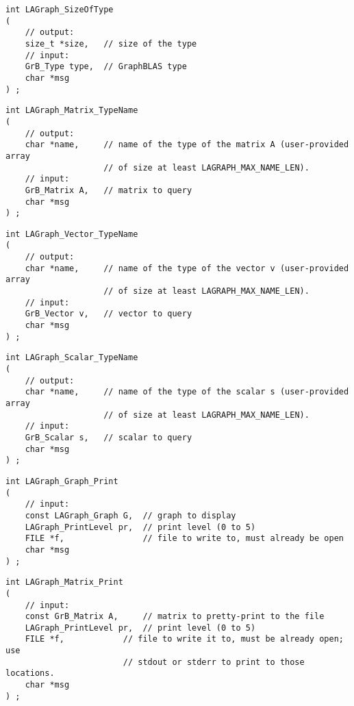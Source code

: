 \begin{verbatim}
int LAGraph_SizeOfType
(
    // output:
    size_t *size,   // size of the type
    // input:
    GrB_Type type,  // GraphBLAS type
    char *msg
) ;
\end{verbatim}




\begin{verbatim}
int LAGraph_Matrix_TypeName
(
    // output:
    char *name,     // name of the type of the matrix A (user-provided array
                    // of size at least LAGRAPH_MAX_NAME_LEN).
    // input:
    GrB_Matrix A,   // matrix to query
    char *msg
) ;
\end{verbatim}




\begin{verbatim}
int LAGraph_Vector_TypeName
(
    // output:
    char *name,     // name of the type of the vector v (user-provided array
                    // of size at least LAGRAPH_MAX_NAME_LEN).
    // input:
    GrB_Vector v,   // vector to query
    char *msg
) ;
\end{verbatim}




\begin{verbatim}
int LAGraph_Scalar_TypeName
(
    // output:
    char *name,     // name of the type of the scalar s (user-provided array
                    // of size at least LAGRAPH_MAX_NAME_LEN).
    // input:
    GrB_Scalar s,   // scalar to query
    char *msg
) ;
\end{verbatim}




\begin{verbatim}
int LAGraph_Graph_Print
(
    // input:
    const LAGraph_Graph G,  // graph to display
    LAGraph_PrintLevel pr,  // print level (0 to 5)
    FILE *f,                // file to write to, must already be open
    char *msg
) ;
\end{verbatim}




\begin{verbatim}
int LAGraph_Matrix_Print
(
    // input:
    const GrB_Matrix A,     // matrix to pretty-print to the file
    LAGraph_PrintLevel pr,  // print level (0 to 5)
    FILE *f,            // file to write it to, must be already open; use
                        // stdout or stderr to print to those locations.
    char *msg
) ;
\end{verbatim}




